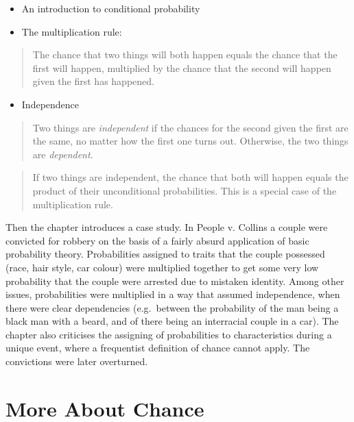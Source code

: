 \documentclass[
]{book}
\providecommand{\tightlist}{%
  \setlength{\itemsep}{0pt}\setlength{\parskip}{0pt}}
\begin{document}
\begin{itemize}
\tightlist
\item
  An introduction to conditional probability
\item
  The multiplication rule:
\end{itemize}

\begin{quote}
The chance that two things will both happen equals the chance that the first will happen, multiplied by the chance that the second will happen given the first has happened.
\end{quote}

\begin{itemize}
\tightlist
\item
  Independence
\end{itemize}

\begin{quote}
Two things are \emph{independent} if the chances for the second given the first are the same, no matter how the first one turns out. Otherwise, the two things are \emph{dependent}.
\end{quote}

\begin{quote}
If two things are independent, the chance that both will happen equals the product of their unconditional probabilities. This is a special case of the multiplication rule.
\end{quote}

Then the chapter introduces a case study. In People v. Collins a couple were convicted for robbery on the basis of a fairly absurd application of basic probability theory. Probabilities assigned to traits that the couple possessed (race, hair style, car colour) were multiplied together to get some very low probability that the couple were arrested due to mistaken identity. Among other issues, probabilities were multiplied in a way that assumed independence, when there were clear dependencies (e.g.~between the probability of the man being a black man with a beard, and of there being an interracial couple in a car). The chapter also criticises the assigning of probabilities to characteristics during a unique event, where a frequentist definition of chance cannot apply. The convictions were later overturned.

\hypertarget{more_chance}{%
\chapter{More About Chance}\label{more_chance}}
\end{document}
